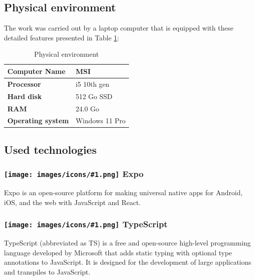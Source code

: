 \subsection{Physical environment}

The work was carried out by a laptop computer that is equipped with these detailed features presented in Table \ref{tab:physical-env}:

\begin{table}[htbp]
    \centering
    \begin{tabular}{|l|l|}
        \hline
        \textbf{Computer Name} & MSI \\
        \hline
        \textbf{Processor} & i5 10th gen \\
        \hline
        \textbf{Hard disk} & 512 Go SSD \\
        \hline
        \textbf{RAM} & 24.0 Go \\
        \hline
        \textbf{Operating system} & Windows 11 Pro \\
        \hline
    \end{tabular}
    \caption{Physical environment}
    \label{tab:physical-env}
\end{table}

\subsection{Used technologies}

\newcommand{\techicon}[1]{%
  \texttt{[image: images/icons/\#1.png]}%
}

\subsubsection*{\protect\techicon{expo} Expo}

Expo is an open-source platform for making universal native apps for Android, iOS, and the web with JavaScript and React.

\subsubsection*{\protect\techicon{typescript} TypeScript}
                                                                
TypeScript (abbreviated as TS) is a free and open-source high-level programming language developed by Microsoft that adds static typing with optional type annotations to JavaScript. It is designed for the development of large applications and transpiles to JavaScript.

